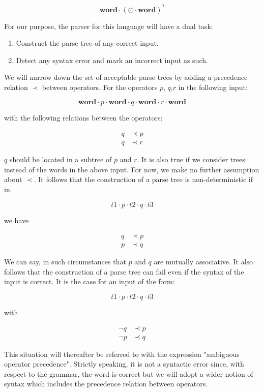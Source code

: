 \documentclass[10pt]{report}
\newcommand{\word}{\textbf{word}}
\newcounter{i}
\begin{document}
\[   \textbf{word} \cdot (\odot \cdot \textbf{word} ) ^ {*} \]

For our purpose, the parser for this language will have a dual task:

\begin{enumerate}
	\item Construct the parse tree of any correct input.
	\item Detect any syntax error and mark an incorrect input as such.
\end{enumerate}

We will narrow down the set of acceptable parse trees by adding a precedence relation $\prec$ between operators.  For the operators $p$, $q$,$r$ in the following input:

\[ \word \cdot p \cdot \word \cdot q \cdot \word \cdot r \cdot \word \]

with the following relations between the operators:

\begin{align*}
	q & \prec p \\
	q & \prec r
\end{align*}

$q$ should be located in a subtree of $p$ and $r$.  It is also true if we consider trees instead of the words in the above input.  For now, we make no further assumption about $\prec$.  It follows that the construction of a parse tree is non-deterministic if in

\[
t1 \cdot p \cdot t2 \cdot q \cdot t3
\]

we have

\begin{align*}
	q & \prec p \\
	p & \prec q
\end{align*}

We can say, in such circumstances that $p$ and $q$ are mutually associative.  It also follows that the construction of a parse tree can fail even if the syntax of the input is correct.  It is the case for an input of the form:

\[
t1 \cdot p \cdot t2 \cdot q \cdot t3
\]

with

\begin{align*}
	\neg q & \prec p \\
	\neg p & \prec q
\end{align*}

This situation will thereafter be referred to with the expression "ambiguous operator precedence".  Strictly speaking, it is not a syntactic error since, with respect to the grammar, the word is correct but we will adopt a wider notion of syntax which includes the precedence relation between operators.  
\end{document}
